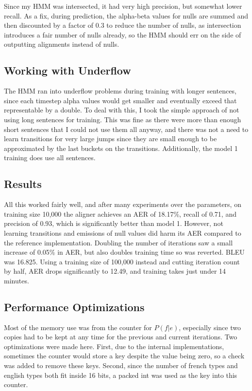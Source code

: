 \documentclass[11pt]{article}
\begin{document}
Since my HMM was intersected, it had very high precision, but somewhat lower recall.
As a fix, during prediction, the alpha-beta values for nulls are summed and then discounted
by a factor of 0.3 to reduce the number of nulls, as intersection introduces a fair number
of nulls already, so the HMM should err on the side of outputting alignments instead of nulls.

\subsection{Working with Underflow}
The HMM ran into underflow problems during training with longer sentences, since each
timestep alpha values would get smaller and eventually exceed that representable by a double.
To deal with this, I took the simple approach of not using long sentences for training.
This was fine as there were more than enough short sentences that I could not use them all
anyway, and there was not a need to learn transitions for very large jumps since they
are small enough to be approximated by the last buckets on the transitions. Additionally,
the model 1 training does use all sentences.

\subsection{Results}
All this worked fairly well, and after many experiments over the parameters,
on training size 10,000 the aligner achieves an AER of 18.17\%, 
recall of 0.71, and precision of 0.93, which is significantly better than model 1. 
However, not learning transitions and emissions of null values did harm its AER compared
to the reference implementation. Doubling the number of iterations saw a small increase
of 0.05\% in AER, but also doubles training time so was reverted. BLEU was 16.825.
Using a training size of 100,000 instead and cutting iteration count by half, AER
drops significantly to 12.49, and training takes just under 14 minutes.

\subsection{Performance Optimizations}

Most of the memory use was from the counter for $P(f|e)$, especially since two copies had to
be kept at any time for the previous and current iterations. Two optimizations were made here.
First, due to the internal implementations, sometimes the counter would store a key despite
the value being zero, so a check was added to remove these keys. Second, since the number
of french types and english types both fit inside 16 bits, a packed int was used as the key
into this counter.
\end{document}
